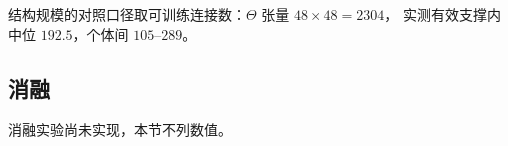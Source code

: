 结构规模的对照口径取可训练连接数：$\Theta$ 张量 $48\times48=2304$，
实测有效支撑内中位 $192.5$，个体间 $105$--$289$。



\subsection{消融}

消融实验尚未实现，本节不列数值。

